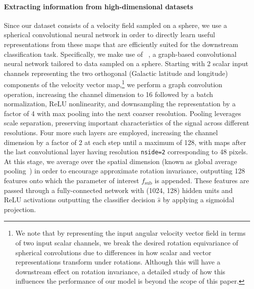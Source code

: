 \documentclass[]{article}
\begin{document}
\paragraph{Extracting information from high-dimensional datasets} Since our dataset consists of a velocity field sampled on a sphere, we use a spherical convolutional neural network in order to directly learn useful representations from these maps that are efficiently suited for the downstream classification task. Specifically, we make use of \deepsphere~\citep{2020arXiv201215000D,deepsphere_cosmo}, a graph-based convolutional neural network tailored to data sampled on a sphere. Starting with 2 scalar input channels representing the two orthogonal (Galactic latitude and longitude) components of the velocity vector map,\footnote{We note that by representing the input angular velocity vector field in terms of two input scalar channels, we break the desired rotation equivariance of spherical convolutions due to differences in how scalar and vector representations transform under rotations. Although this will have a downstream effect on rotation invariance, a detailed study of how this influences the performance of our model is beyond the scope of this paper.} we perform a graph convolution operation, increasing the channel dimension to 16 followed by a batch normalization, ReLU nonlinearity, and downsampling the representation by a factor of 4 with max pooling into the next coarser \healpix resolution. Pooling leverages scale separation, preserving important characteristics of the signal across different resolutions. 
Four more such layers are employed, increasing the channel dimension by a factor of 2 at each step until a maximum of 128, with maps after the last convolutional layer having resolution \texttt{nside=2} corresponding to 48 pixels. At this stage, we average over the spatial dimension (known as global average pooling~\citep{lin2014network}) in order to encourage approximate rotation invariance, outputting 128 features onto which the parameter of interest $f_\mathrm{sub}$ is appended. These features are passed through a fully-connected network with (1024, 128) hidden units and ReLU activations outputting the classifier decision $\hat s$ by applying a sigmoidal projection.
\end{document}
